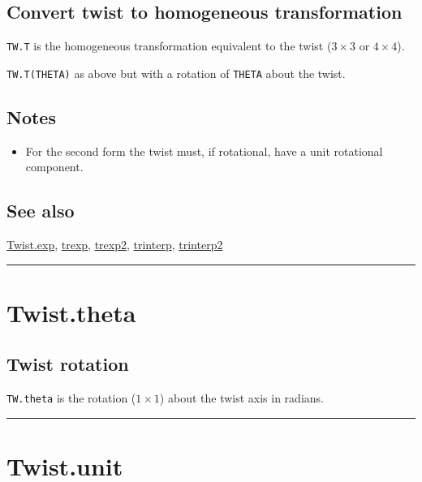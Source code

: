 \subsection*{Convert twist to homogeneous transformation}


\texttt{TW.T} is the homogeneous transformation equivalent to the twist ($3 \times 3$ or $4 \times 4$).



\texttt{TW.T(THETA)} as above but with a rotation of \texttt{THETA} about the twist.


\subsection*{Notes}
\begin{itemize}
  \item For the second form the twist must, if rotational, have a unit rotational component.
\end{itemize}

\subsection*{See also}


\hyperlink{Twist.exp}{\color{blue} Twist.exp}, \hyperlink{trexp}{\color{blue} trexp}, \hyperlink{trexp2}{\color{blue} trexp2}, \hyperlink{trinterp}{\color{blue} trinterp}, \hyperlink{trinterp2}{\color{blue} trinterp2}

\vspace{1.5ex}\hrule

\hypertarget{Twist.theta}{\section*{Twist.theta}}
\subsection*{Twist rotation}


\texttt{TW.theta} is the rotation ($1 \times 1$) about the twist axis in radians.

\vspace{1.5ex}\hrule

\hypertarget{Twist.unit}{\section*{Twist.unit}}
